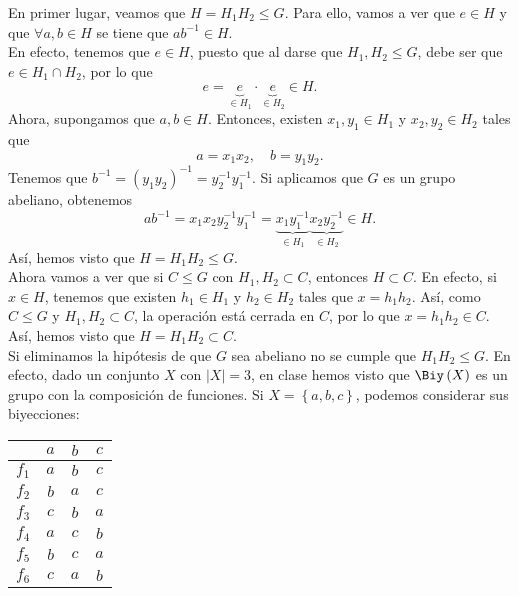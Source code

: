 \documentclass{article}
\begin{document}
En primer lugar, veamos que $\displaystyle H = H_{1}H_{2} \leq G $. Para ello, vamos a ver que $\displaystyle e \in H $ y que $\displaystyle \forall a,b \in H $ se tiene que $\displaystyle ab^{-1} \in H $. \\
En efecto, tenemos que $\displaystyle e \in H $, puesto que al darse que $\displaystyle H_{1}, H_{2} \leq G $, debe ser que $\displaystyle e \in H_{1} \cap H_{2} $, por lo que 
\[e = \underbrace{e}_{\in H_{1}} \cdot \underbrace{e}_{\in H_{2}} \in H .\]
Ahora, supongamos que $\displaystyle a,b \in H $. Entonces, existen $\displaystyle x_{1}, y_{1} \in H_{1} $ y $\displaystyle x_{2}, y_{2} \in H_{2}$ tales que
\[a = x_{1}x_{2}, \quad b = y_{1}y_{2} .\]
Tenemos que $\displaystyle b^{-1} = \left(y_{1}y_{2}\right)^{-1} = y^{-1}_{2}y^{-1}_{1} $. Si aplicamos que $\displaystyle G $ es un grupo abeliano, obtenemos 
\[ab^{-1} = x_{1}x_{2}y^{-1}_{2}y^{-1}_{1} = \underbrace{x_{1}y^{-1}_{1}}_{\in H_{1}}\underbrace{x_{2}y^{-1}_{2}}_{\in H_{2}} \in H.\]
Así, hemos visto que $\displaystyle H = H_{1} H_{2} \leq G $. \\
Ahora vamos a ver que si $\displaystyle C \leq G $ con $\displaystyle H_{1}, H_{2} \subset C $, entonces $\displaystyle H \subset C $. En efecto, si $\displaystyle x \in H $, tenemos que existen $\displaystyle h_{1} \in H_{1} $ y $\displaystyle h_{2} \in H_{2} $ tales que $\displaystyle x = h_{1} h_{2} $. Así, como $\displaystyle C \leq G $ y $\displaystyle H_{1}, H_{2} \subset C $, la operación está cerrada en $\displaystyle C $, por lo que $\displaystyle x = h_{1} h_{2} \in C $. Así, hemos visto que $\displaystyle H = H_{1} H_{2} \subset C $. \\
Si eliminamos la hipótesis de que $\displaystyle G $ sea abeliano no se cumple que $\displaystyle H_{1} H_{2} \leq G $. En efecto, dado un conjunto $\displaystyle X $ con $\displaystyle \left|X\right|=3 $, en clase hemos visto que $\displaystyle \Biy\left(X\right) $ es un grupo con la composición de funciones.  Si $\displaystyle X = \left\{ a,b,c\right\}  $, podemos considerar sus biyecciones:
\begin{center}
\begin{tabular}{c | c c c}
	& $\displaystyle a $ & $\displaystyle b $ & $\displaystyle c $ \\
	\hline
	$\displaystyle f_{1} $ & $\displaystyle a $ & $\displaystyle b $ & $\displaystyle c $ \\
	$\displaystyle f_{2} $ & $\displaystyle b $ & $\displaystyle a $ & $\displaystyle c $ \\
	$\displaystyle f_{3} $ & $\displaystyle c $ & $\displaystyle b $ & $\displaystyle a $ \\
	$\displaystyle f_{4} $ & $\displaystyle a $ & $\displaystyle c $ & $\displaystyle b $ \\
	$\displaystyle f_{5} $ & $\displaystyle b $ & $\displaystyle c $ & $\displaystyle a $ \\
	$\displaystyle f_{6} $ & $\displaystyle c $ & $\displaystyle a $ & $\displaystyle b $ 
\end{tabular}
\end{center}
\end{document}
